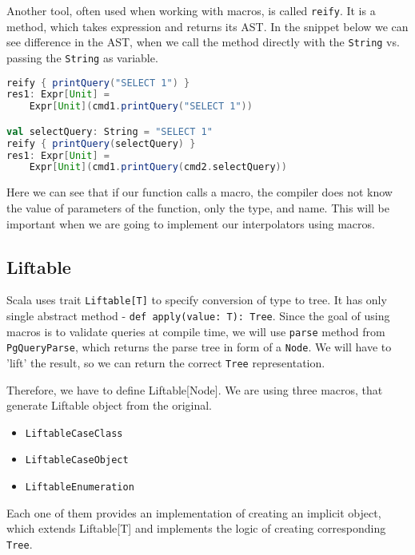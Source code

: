 Another tool, often used when working with macros, is called \texttt{reify}. It is a method, which takes expression and returns its AST. In the snippet below we can see difference in the AST, when we call the method directly with the \texttt{String} vs. passing the \texttt{String} as variable.
\begin{lstlisting}[language=scala, basicstyle=\ttfamily, showstringspaces=false]
reify { printQuery("SELECT 1") }
res1: Expr[Unit] = 
    Expr[Unit](cmd1.printQuery("SELECT 1"))

val selectQuery: String = "SELECT 1"
reify { printQuery(selectQuery) }
res1: Expr[Unit] = 
    Expr[Unit](cmd1.printQuery(cmd2.selectQuery))
\end{lstlisting}
Here we can see that if our function calls a macro, the compiler does not know the value of parameters of the function, only the type, and name. This will be important when we are going to implement our interpolators using macros.

\subsection{Liftable}
Scala uses trait \texttt{Liftable[T]} to specify conversion of type to tree. It has only single abstract method - \texttt{def apply(value: T): Tree}. Since the goal of using macros is to validate queries at compile time, we will use \texttt{parse} method from \texttt{PgQueryParse}, which returns the parse tree in form of a \texttt{Node}. We will have to 'lift' the result, so we can return the correct \texttt{Tree} representation. \cite{Liftable}

Therefore, we have to define Liftable[Node]. We are using three macros, that generate Liftable object from the original. 
\begin{itemize}
    \item \texttt{LiftableCaseClass}
    \item \texttt{LiftableCaseObject}
    \item \texttt{LiftableEnumeration}
\end{itemize}
Each one of them provides an implementation of creating an implicit object, which extends Liftable[T] and implements the logic of creating corresponding \texttt{Tree}.
